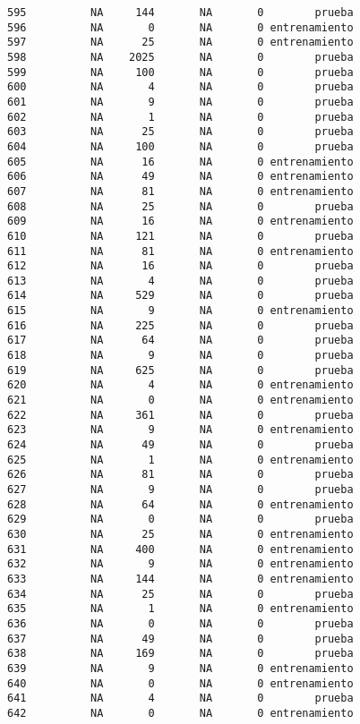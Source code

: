\documentclass[
  letterpaper,
  DIV=11,
  numbers=noendperiod]{scrreprt}
\begin{document}
\begin{verbatim}
595          NA     144       NA       0        prueba
596          NA       0       NA       0 entrenamiento
597          NA      25       NA       0 entrenamiento
598          NA    2025       NA       0        prueba
599          NA     100       NA       0        prueba
600          NA       4       NA       0        prueba
601          NA       9       NA       0        prueba
602          NA       1       NA       0        prueba
603          NA      25       NA       0        prueba
604          NA     100       NA       0        prueba
605          NA      16       NA       0 entrenamiento
606          NA      49       NA       0 entrenamiento
607          NA      81       NA       0 entrenamiento
608          NA      25       NA       0        prueba
609          NA      16       NA       0 entrenamiento
610          NA     121       NA       0        prueba
611          NA      81       NA       0 entrenamiento
612          NA      16       NA       0        prueba
613          NA       4       NA       0        prueba
614          NA     529       NA       0        prueba
615          NA       9       NA       0 entrenamiento
616          NA     225       NA       0        prueba
617          NA      64       NA       0        prueba
618          NA       9       NA       0        prueba
619          NA     625       NA       0        prueba
620          NA       4       NA       0 entrenamiento
621          NA       0       NA       0 entrenamiento
622          NA     361       NA       0        prueba
623          NA       9       NA       0 entrenamiento
624          NA      49       NA       0        prueba
625          NA       1       NA       0 entrenamiento
626          NA      81       NA       0        prueba
627          NA       9       NA       0        prueba
628          NA      64       NA       0 entrenamiento
629          NA       0       NA       0        prueba
630          NA      25       NA       0 entrenamiento
631          NA     400       NA       0 entrenamiento
632          NA       9       NA       0 entrenamiento
633          NA     144       NA       0 entrenamiento
634          NA      25       NA       0        prueba
635          NA       1       NA       0 entrenamiento
636          NA       0       NA       0        prueba
637          NA      49       NA       0        prueba
638          NA     169       NA       0        prueba
639          NA       9       NA       0 entrenamiento
640          NA       0       NA       0 entrenamiento
641          NA       4       NA       0        prueba
642          NA       0       NA       0 entrenamiento

\end{verbatim}
\end{document}
